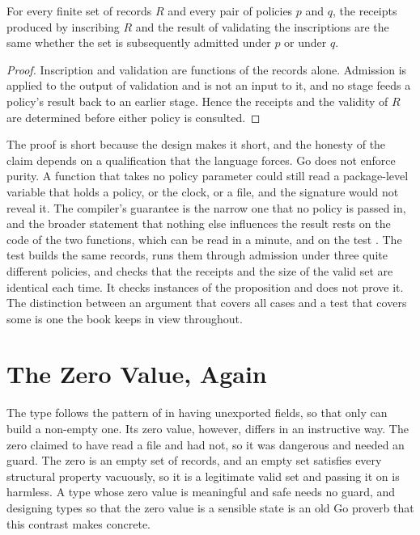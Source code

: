 \begin{proposition}\label{prop:independence}
For every finite set of records $R$ and every pair of policies $p$ and $q$, the receipts produced by inscribing $R$ and the result of validating the inscriptions are the same whether the set is subsequently admitted under $p$ or under $q$.
\end{proposition}

\begin{proof}
Inscription and validation are functions of the records alone. Admission is applied to the output of validation and is not an input to it, and no stage feeds a policy's result back to an earlier stage. Hence the receipts and the validity of $R$ are determined before either policy is consulted.
\end{proof}

The proof is short because the design makes it short, and the honesty of the claim depends on a qualification that the language forces. Go does not enforce purity. A function that takes no policy parameter could still read a package-level variable that holds a policy, or the clock, or a file, and the signature would not reveal it. The compiler's guarantee is the narrow one that no policy is passed in, and the broader statement that nothing else influences the result rests on the code of the two functions, which can be read in a minute, and on the test . The test builds the same records, runs them through admission under three quite different policies, and checks that the receipts and the size of the valid set are identical each time. It checks instances of the proposition and does not prove it. The distinction between an argument that covers all cases and a test that covers some is one the book keeps in view throughout.

\section{The Zero Value, Again}

The type  follows the pattern of  in having unexported fields, so that only  can build a non-empty one. Its zero value, however, differs in an instructive way. The zero  claimed to have read a file and had not, so it was dangerous and needed an  guard. The zero  is an empty set of records, and an empty set satisfies every structural property vacuously, so it is a legitimate valid set and passing it on is harmless. A type whose zero value is meaningful and safe needs no guard, and designing types so that the zero value is a sensible state is an old Go proverb that this contrast makes concrete.


